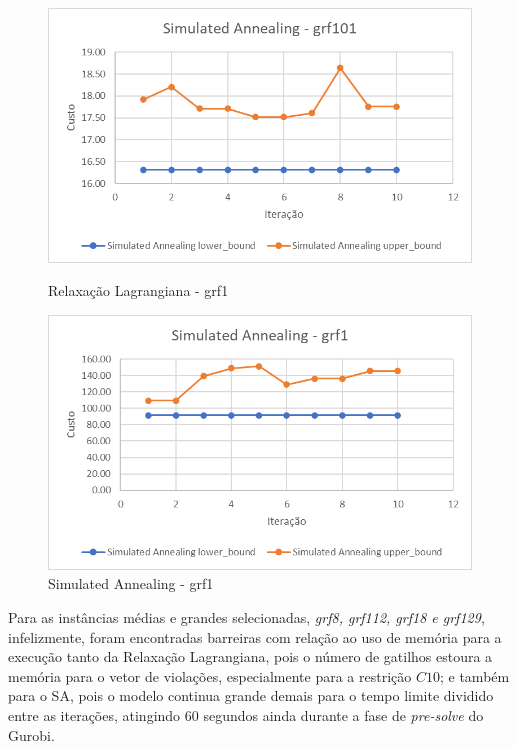 \begin{figure}[H]
    \centering
    \begin{minipage}{0.48\textwidth}
        \centering
        \includegraphics[width=\linewidth]{./images/grf101_SA.png}
        \caption{Relaxação Lagrangiana - grf1}
        \label{fig:grf1_RL}
    \end{minipage}
    \hfill
    \begin{minipage}{0.48\textwidth}
        \centering
        \includegraphics[width=\linewidth]{./images/grf1_SA.png}
        \caption{Simulated Annealing - grf1}
        \label{fig:grf1_SA}
    \end{minipage}
\end{figure}

Para as instâncias médias e grandes selecionadas, \emph{grf8, grf112, grf18 e grf129}, infelizmente, foram encontradas barreiras com relação ao uso de memória para a execução tanto da Relaxação Lagrangiana, pois o número de gatilhos estoura a memória para o vetor de violações, especialmente para a restrição $C10$; e também para o SA, pois o modelo continua grande demais para o tempo limite dividido entre as iterações, atingindo $60$ segundos ainda durante a fase de \emph{pre-solve} do Gurobi.

